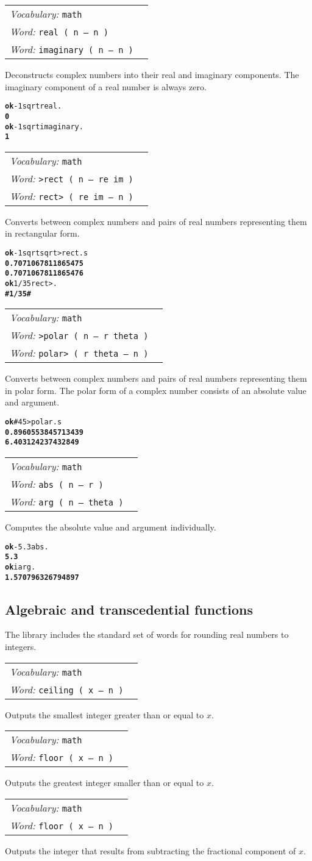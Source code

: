 \documentclass{book}
\newcommand{\tto}{\symbol{123}}
\newcommand{\ttc}{\symbol{125}}
\newcommand{\vocabulary}[1]{\emph{Vocabulary:} \texttt{#1}&\\}
\newcommand{\ordinaryword}[2]{\index{\texttt{#1}}\emph{Word:} \texttt{#2}&\\}
\newcommand{\wordtable}[1]{


\begin{tabularx}{12cm}{lX}
\hline
#1
\hline
\end{tabularx}

}
\begin{document}
\wordtable{
\vocabulary{math}
\ordinaryword{real}{real ( n -- n )}
\ordinaryword{imaginary}{imaginary ( n -- n )}
}
Deconstructs complex numbers into their real and imaginary components. The imaginary component of a real number is always zero.
\begin{alltt}
\textbf{ok} -1 sqrt real .
\textbf{0}
\textbf{ok} -1 sqrt imaginary .
\textbf{1}
\end{alltt}
\wordtable{
\vocabulary{math}
\ordinaryword{>rect}{>rect ( n -- re im )}
\ordinaryword{rect>}{rect> ( re im -- n )}
}
Converts between complex numbers and pairs of real numbers representing them in rectangular form.
\begin{alltt}
\textbf{ok} -1 sqrt sqrt >rect .s
\textbf{0.7071067811865475
0.7071067811865476}
\textbf{ok} 1/3 5 rect> .
\textbf{\#\tto 1/3 5 \ttc\#}
\end{alltt}

\wordtable{
\vocabulary{math}
\ordinaryword{>polar}{>polar ( n -- r theta )}
\ordinaryword{polar>}{polar> ( r theta -- n )}
}
Converts between complex numbers and pairs of real numbers representing them in polar form. The polar form of a complex number consists of an absolute value and argument.
\begin{alltt}
\textbf{ok} \#\tto 4 5 \ttc >polar .s
\textbf{0.8960553845713439
6.403124237432849}
\end{alltt}

\wordtable{
\vocabulary{math}
\ordinaryword{abs}{abs ( n -- r )}
\ordinaryword{arg}{arg ( n -- theta )}

}
Computes the absolute value and argument individually.
\begin{alltt}
\textbf{ok} -5.3 abs .
\textbf{5.3}
\textbf{ok} i arg .
\textbf{1.570796326794897}
\end{alltt}

\subsection{Algebraic and transcedential functions}\label{algebraic}

The library includes the standard set of words for rounding real numbers to integers.

\wordtable{
\vocabulary{math}
\ordinaryword{ceiling}{ceiling ( x -- n )}
}
Outputs the smallest integer greater than or equal to $x$.
\wordtable{
\vocabulary{math}
\ordinaryword{floor}{floor ( x -- n )}
}
Outputs the greatest integer smaller than or equal to $x$.
\wordtable{
\vocabulary{math}
\ordinaryword{truncate}{floor ( x -- n )}
}
Outputs the integer that results from subtracting the fractional component of $x$.
\end{document}

